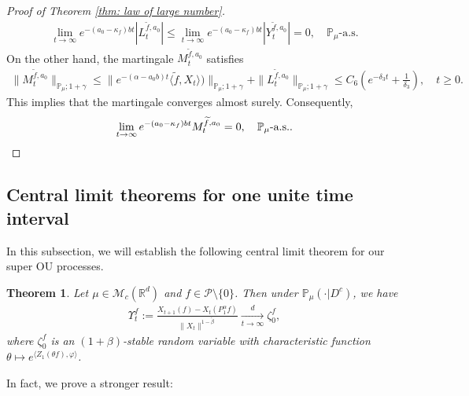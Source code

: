 \documentclass[12pt,a4paper]{amsart}
\theoremstyle{plain}
\newtheorem{thm}{Theorem}[section]
\theoremstyle{definition}
\numberwithin{equation}{section}
\begin{document}
\begin{proof}[Proof of Theorem \ref{thm: law of large number}]
\begin{align}
  \lim_{t\rightarrow \infty}e^{-(a_0 - \kappa_f)bt}|L_t^{\widetilde{f},a_0}|
  \leq  \lim_{t\rightarrow \infty}e^{-(a_0 - \kappa_f)bt}|Y_t^{\widetilde{f},a_0}|=0, \quad
  \mathbb P_\mu\text{-a.s.}
\end{align}
On the other hand, the martingale $M_t^{\widetilde{f},a_0}$ satisfies
\begin{align}
  \|M_t^{\widetilde{f},a_0}\|_{\mathbb{P}_{\mu};1+\gamma}
  \leq \|e^{-(\alpha-a_0 b)t}\langle \widetilde{f},X_t\rangle)\|_{\mathbb{P}_{\mu};1+\gamma}+\|L_t^{\widetilde{f},a_0}\|_{\mathbb{P}_{\mu};1+\gamma}
  \leq C_6(e^{-\delta_3 t}+\frac{1}{\delta_3}),
  \quad t\geq 0.
\end{align}
This implies that the martingale converges almost surely.
Consequently,
\[
	\lim_{t\rightarrow\infty} e^{-(a_0-\kappa_f)bt}M_t^{\widetilde{f},a_0}
	= 0,
	\quad \mathbb P_\mu\text{-a.s.}.
  \qedhere
\]
\end{proof}



\subsection{Central limit theorems for one unite time interval}
\label{sec:critical}
In this subsection, we will establish the following  central limit theorem for our super OU processes.
\begin{thm}
  \label{lem:PR:LC}
  Let $\mu \in \mathcal M_c(\mathbb R^d)$ and $f\in \mathcal{P}\setminus \{0\}$.
  Then under $\mathbb{P}_{\mu}(\cdot | D ^c)$, we have
  \begin{align}
    \label{eq:PR:LC:1}
    \Upsilon^f_t
    := \frac{X_{t+1} (f) - X_t(P_1^\alpha f)}{\| X_t\|^{1-\tilde \beta}}
    \xrightarrow[t\to \infty]{d}\zeta^f_0,
  \end{align}
  where $\zeta^f_0$ is an $(1+\beta)$-stable random variable with characteristic function $\theta\mapsto e^{\langle Z_1(\theta f), \varphi\rangle}$.
\end{thm}

In fact, we  prove a stronger result:
\end{document}
